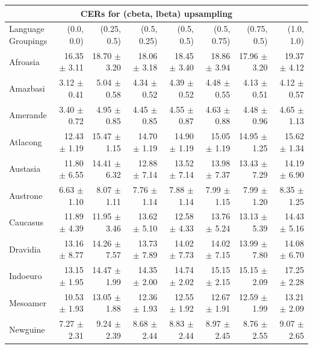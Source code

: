 \begin{table}[htbp]
  \centering
  \begin{adjustbox}{max width=\textwidth}
  \begin{tabular}{l r r r r r r r}
    \toprule
    \multicolumn{8}{c}{\textbf{CERs for (cbeta, lbeta) upsampling}} \\
    \midrule
    \makecell{Language\\Groupings} & (0.0, 0.0) & (0.25, 0.5) & (0.5, 0.25) & (0.5, 0.5) & (0.5, 0.75) & (0.75, 0.5) & (1.0, 1.0) \\
    \midrule
    Afroasia   & 16.35 $\pm$ 3.11 & 18.70 $\pm$ 3.20 & 18.06 $\pm$ 3.18 & 18.45 $\pm$ 3.40 & 18.86 $\pm$ 3.94 & 17.96 $\pm$ 3.20 & 19.37 $\pm$ 4.12 \\
    Amazbasi   & 3.12 $\pm$ 0.41  & 5.04 $\pm$ 0.58  & 4.34 $\pm$ 0.52  & 4.39 $\pm$ 0.52  & 4.48 $\pm$ 0.55  & 4.13 $\pm$ 0.51  & 4.12 $\pm$ 0.57  \\
    Amerande   & 3.40 $\pm$ 0.72  & 4.95 $\pm$ 0.85  & 4.45 $\pm$ 0.85  & 4.55 $\pm$ 0.87  & 4.63 $\pm$ 0.88  & 4.48 $\pm$ 0.96  & 4.65 $\pm$ 1.13  \\
    Atlacong   & 12.43 $\pm$ 1.19 & 15.47 $\pm$ 1.15 & 14.70 $\pm$ 1.19 & 14.90 $\pm$ 1.19 & 15.05 $\pm$ 1.19 & 14.95 $\pm$ 1.25 & 15.62 $\pm$ 1.34 \\
    Austasia   & 11.80 $\pm$ 6.55 & 14.41 $\pm$ 6.32 & 12.88 $\pm$ 7.14 & 13.52 $\pm$ 7.14 & 13.98 $\pm$ 7.37 & 13.43 $\pm$ 7.29 & 14.19 $\pm$ 6.90 \\
    Austrone   & 6.63 $\pm$ 1.10  & 8.07 $\pm$ 1.11  & 7.76 $\pm$ 1.14  & 7.88 $\pm$ 1.14  & 7.99 $\pm$ 1.15  & 7.99 $\pm$ 1.20  & 8.35 $\pm$ 1.25  \\
    Caucasus   & 11.89 $\pm$ 4.39 & 11.95 $\pm$ 3.46 & 13.62 $\pm$ 5.10 & 12.58 $\pm$ 4.33 & 13.76 $\pm$ 5.24 & 13.13 $\pm$ 5.39 & 14.43 $\pm$ 5.16 \\
    Dravidia   & 13.16 $\pm$ 8.77 & 14.26 $\pm$ 7.57 & 13.73 $\pm$ 7.89 & 14.02 $\pm$ 7.73 & 14.02 $\pm$ 7.15 & 13.99 $\pm$ 7.80 & 14.08 $\pm$ 6.70 \\
    Indoeuro   & 13.15 $\pm$ 1.95 & 14.47 $\pm$ 1.99 & 14.35 $\pm$ 2.00 & 14.74 $\pm$ 2.02 & 15.15 $\pm$ 2.15 & 15.15 $\pm$ 2.09 & 17.25 $\pm$ 2.28 \\
    Mesoamer   & 10.53 $\pm$ 1.93 & 13.05 $\pm$ 1.88 & 12.36 $\pm$ 1.93 & 12.55 $\pm$ 1.92 & 12.67 $\pm$ 1.91 & 12.59 $\pm$ 1.99 & 13.21 $\pm$ 2.09 \\
    Newguine   & 7.27 $\pm$ 2.31  & 9.24 $\pm$ 2.39  & 8.68 $\pm$ 2.44  & 8.83 $\pm$ 2.44  & 8.97 $\pm$ 2.45  & 8.76 $\pm$ 2.55  & 9.07 $\pm$ 2.65  \\

\end{tabular}
\end{adjustbox}
\end{table}
